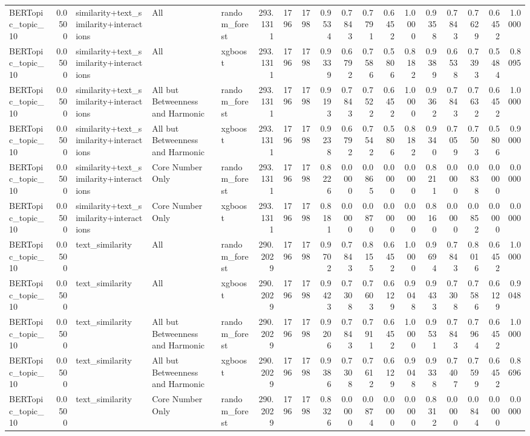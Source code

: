 \begin{tabular}{lrlllrrrrrrrrrrrrr}
BERTopic_topic_10 & 0.0500 & similarity+text_similarity+interactions & All & random_forest & 293.1311 & 1796 & 1798 & 0.9534 & 0.7843 & 0.7791 & 0.6452 & 1.0000 & 0.9358 & 0.7843 & 0.7629 & 0.6452 & 1.0000 \\
BERTopic_topic_10 & 0.0500 & similarity+text_similarity+interactions & All & xgboost & 293.1311 & 1796 & 1798 & 0.9339 & 0.6792 & 0.7586 & 0.5806 & 0.8182 & 0.9389 & 0.6538 & 0.7393 & 0.5484 & 0.8095 \\
BERTopic_topic_10 & 0.0500 & similarity+text_similarity+interactions & All but Betweenness and Harmonic & random_forest & 293.1311 & 1796 & 1798 & 0.9193 & 0.7843 & 0.7522 & 0.6452 & 1.0000 & 0.9362 & 0.7843 & 0.7632 & 0.6452 & 1.0000 \\
BERTopic_topic_10 & 0.0500 & similarity+text_similarity+interactions & All but Betweenness and Harmonic & xgboost & 293.1311 & 1796 & 1798 & 0.9238 & 0.6792 & 0.7542 & 0.5806 & 0.8182 & 0.9340 & 0.7059 & 0.7503 & 0.5806 & 0.9000 \\
BERTopic_topic_10 & 0.0500 & similarity+text_similarity+interactions & Core Number Only & random_forest & 293.1311 & 1796 & 1798 & 0.8226 & 0.0000 & 0.0865 & 0.0000 & 0.0000 & 0.8211 & 0.0000 & 0.0838 & 0.0000 & 0.0000 \\
BERTopic_topic_10 & 0.0500 & similarity+text_similarity+interactions & Core Number Only & xgboost & 293.1311 & 1796 & 1798 & 0.8181 & 0.0000 & 0.0870 & 0.0000 & 0.0000 & 0.8160 & 0.0000 & 0.0852 & 0.0000 & 0.0000 \\
BERTopic_topic_10 & 0.0500 & text_similarity & All & random_forest & 290.2029 & 1796 & 1798 & 0.9702 & 0.7843 & 0.8155 & 0.6452 & 1.0000 & 0.9694 & 0.7843 & 0.8016 & 0.6452 & 1.0000 \\
BERTopic_topic_10 & 0.0500 & text_similarity & All & xgboost & 290.2029 & 1796 & 1798 & 0.9423 & 0.7308 & 0.7603 & 0.6129 & 0.9048 & 0.9433 & 0.7308 & 0.7586 & 0.6129 & 0.9048 \\
BERTopic_topic_10 & 0.0500 & text_similarity & All but Betweenness and Harmonic & random_forest & 290.2029 & 1796 & 1798 & 0.9206 & 0.7843 & 0.7911 & 0.6452 & 1.0000 & 0.9531 & 0.7843 & 0.7964 & 0.6452 & 1.0000 \\
BERTopic_topic_10 & 0.0500 & text_similarity & All but Betweenness and Harmonic & xgboost & 290.2029 & 1796 & 1798 & 0.9386 & 0.7308 & 0.7612 & 0.6129 & 0.9048 & 0.9338 & 0.7407 & 0.7599 & 0.6452 & 0.8696 \\
BERTopic_topic_10 & 0.0500 & text_similarity & Core Number Only & random_forest & 290.2029 & 1796 & 1798 & 0.8326 & 0.0000 & 0.0874 & 0.0000 & 0.0000 & 0.8312 & 0.0000 & 0.0844 & 0.0000 & 0.0000 \\

\end{tabular}
